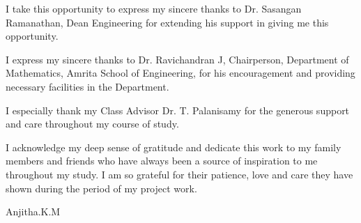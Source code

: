 \documentclass[a4paper,12pt]{article}
\numberwithin{equation}{section}
\begin{document}
I take this opportunity to express my sincere thanks to Dr. Sasangan Ramanathan, Dean Engineering for extending his support in giving me this opportunity.\vspace{0.5cm}

I express my sincere thanks to Dr. Ravichandran J, Chairperson, Department of Mathematics, Amrita School of Engineering, for his encouragement and providing necessary facilities in the Department.\vspace{0.5cm}

I especially thank my Class Advisor Dr. T. Palanisamy for the generous support and care throughout my course of study.\vspace{0.5cm}

I acknowledge my deep sense of gratitude and dedicate this work to my family members and friends who have always been a source of inspiration to me throughout my study. I am so grateful for their patience, love and care they have shown during the period of my project work.\vspace{0.5cm}

\begin{flushright}Anjitha.K.M\end{flushright}

\newpage
\end{document}
